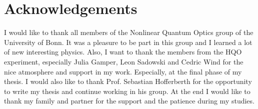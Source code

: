 \chapter*{Acknowledgements}
\label{sec:ack}

I would like to thank all members of the Nonlinear Quantum Optics group of the University of Bonn.
It was a pleasure to be part in this group and I learned a lot of new interesting physics.
Also, I want to thank the members from the HQO experiment, especially Julia Gamper, Leon Sadowski and Cedric Wind for the nice
atmosphere and support in my work.
Especially, at the final phase of my thesis.
I would also like to thank Prof. Sebastian Hofferberth for the opportunity to write my thesis and continue working in his group.
At the end I would like to thank my family and partner for the support and the patience during my studies.


